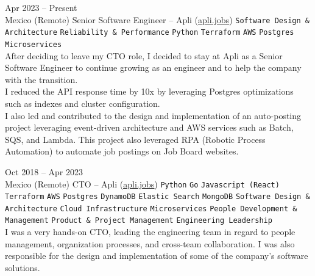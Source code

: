 \documentclass[9pt]{developercv} %
\begin{document}
\begin{entrylist}
    \entry
        {
            Apr 2023 -- Present
            \\\footnotesize{Mexico (Remote)}
        }
        {Senior Software Engineer – Apli ({\href{https://apli.jobs/}{\underline{apli.jobs}}}) }
        {
            \texttt{Software Design \& Architecture}
            \slashsep\texttt{Reliability \& Performance}
            \slashsep\texttt{Python}
            \slashsep\texttt{Terraform}
            \slashsep\texttt{AWS}
            \slashsep\texttt{Postgres}
            \slashsep\texttt{Microservices}
        }
        {\\
            After deciding to leave my CTO role, I decided to stay at Apli as a Senior Software 
            Engineer to continue growing as an engineer and to help the company with the transition.\\

            I reduced the API response time by 10x by leveraging Postgres optimizations such as 
            indexes and cluster configuration.\\

            I also led and contributed to the design and implementation of an auto-posting project
            leveraging event-driven architecture and AWS services such as Batch, SQS, and Lambda. 
            This project also leveraged RPA (Robotic Process Automation) to automate job postings on
            Job Board websites.
        }

    \entry
        {
            Oct 2018 -- Apr 2023
            \\\footnotesize{Mexico (Remote)}
        }
        {CTO – Apli ({\href{https://apli.jobs/}{\underline{apli.jobs}}}) }
        {
            \texttt{Python}
            \slashsep\texttt{Go}
            \slashsep\texttt{Javascript (React)}
            \slashsep\texttt{Terraform}
            \slashsep\texttt{AWS}
            \slashsep\texttt{Postgres}
            \slashsep\texttt{DynamoDB}
            \slashsep\texttt{Elastic Search}
            \slashsep\texttt{MongoDB}
            \slashsep\texttt{Software Design \& Architecture}
            \slashsep\texttt{Cloud Infrastructure}
            \slashsep\texttt{Microservices}
            \slashsep\texttt{People Development \& Management}
            \slashsep\texttt{Product \& Project Management}
            \slashsep\texttt{Engineering Leadership}
        }
        {\\
            I was a very hands-on CTO, leading the engineering team in regard to people management,
            organization processes, and cross-team collaboration. I was also responsible for the 
            design and implementation of some of the company's software solutions.\\

}
\end{entrylist}
\end{document}
